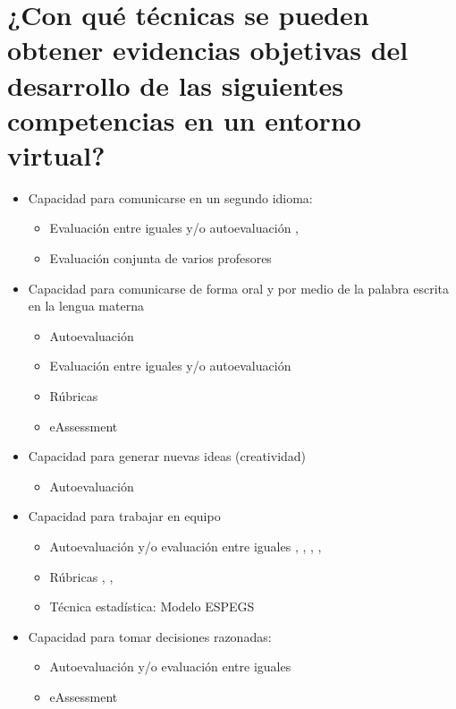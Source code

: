 \section{¿Con qué técnicas se pueden obtener evidencias objetivas del desarrollo de las siguientes competencias en un entorno virtual?}
\begin{itemize}
\item Capacidad para comunicarse en un segundo idioma:
	\begin{itemize} 
	\item Evaluación entre iguales y/o autoevaluación \cite{Shih:2011}, \cite{Masip-Alvarez:2013}
	\item Evaluación conjunta de varios profesores \cite{MercedesRico:2013}
	\end{itemize}
\item Capacidad para comunicarse de forma oral y por medio de la palabra escrita en la lengua materna
	\begin{itemize} 
	\item Autoevaluación \cite{Liao:2013}
	\item Evaluación entre iguales y/o autoevaluación \cite{Masip-Alvarez:2013}
	\item Rúbricas \cite{Mohamed:2008}
	\item eAssessment \cite{Bedek:2011}
	\end{itemize}
\item Capacidad para generar nuevas ideas (creatividad)
	\begin{itemize} 
	\item Autoevaluación \cite{Liao:2013}
	\end{itemize}
\item Capacidad para trabajar en equipo
	\begin{itemize} 
	\item Autoevaluación y/o evaluación entre iguales \cite{McMahon:2007}, \cite{Lim:2011}, \cite{Masip-Alvarez:2013}, \cite{Liao:2013}, \cite{Gil:2011}
	\item Rúbricas \cite{Mohamed:2008}, \cite{Piedra:2010}, \cite{Velasco:2012}	
	\item Técnica estadística: Modelo ESPEGS \cite{Rashid:2008}
	\end{itemize}
\item Capacidad para tomar decisiones razonadas:
	\begin{itemize} 
	\item Autoevaluación y/o evaluación entre iguales \cite{Achcaoucaou:2012}
	\item eAssessment \cite{Borrajo:2010}

\end{itemize}
\end{itemize}
